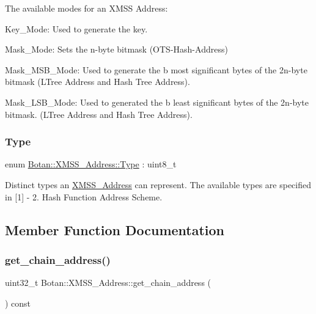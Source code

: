 The available modes for an X\+M\+SS Address\+:
\begin{DoxyItemize}
\item Key\+\_\+\+Mode\+: Used to generate the key.
\item Mask\+\_\+\+Mode\+: Sets the n-\/byte bitmask (O\+T\+S-\/\+Hash-\/\+Address)
\item Mask\+\_\+\+M\+S\+B\+\_\+\+Mode\+: Used to generate the b most significant bytes of the 2n-\/byte bitmask (L\+Tree Address and Hash Tree Address).
\item Mask\+\_\+\+L\+S\+B\+\_\+\+Mode\+: Used to generated the b least significant bytes of the 2n-\/byte bitmask. (L\+Tree Address and Hash Tree Address). 
\end{DoxyItemize}\mbox{\label{class_botan_1_1_x_m_s_s___address_a0101e45c5608cf312b497bf6d855000e}} 
\subsubsection{\texorpdfstring{Type}{Type}}
{\footnotesize\ttfamily enum \hyperlink{class_botan_1_1_x_m_s_s___address_a0101e45c5608cf312b497bf6d855000e}{Botan\+::\+X\+M\+S\+S\+\_\+\+Address\+::\+Type} \+: uint8\+\_\+t\hspace{0.3cm}{\ttfamily [strong]}}

Distinct types an \hyperlink{class_botan_1_1_x_m_s_s___address}{X\+M\+S\+S\+\_\+\+Address} can represent. The available types are specified in \mbox{[}1\mbox{]} -\/ 2. Hash Function Address Scheme. 

\subsection{Member Function Documentation}
\mbox{\label{class_botan_1_1_x_m_s_s___address_adbab35e6d0dc8a0ff3e5c95ffa73cbee}} 
\subsubsection{\texorpdfstring{get\+\_\+chain\+\_\+address()}{get\_chain\_address()}}
{\footnotesize\ttfamily uint32\+\_\+t Botan\+::\+X\+M\+S\+S\+\_\+\+Address\+::get\+\_\+chain\+\_\+address (\begin{DoxyParamCaption}{ }\end{DoxyParamCaption}) const\hspace{0.3cm}{\ttfamily [inline]}}

